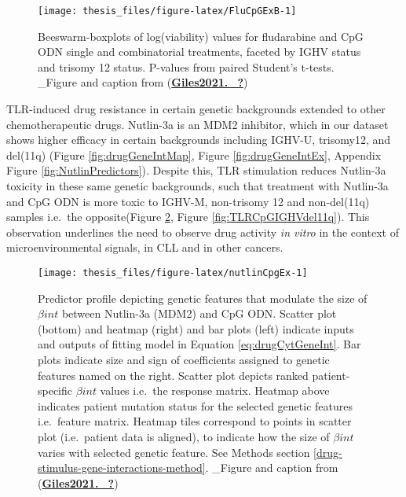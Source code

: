 \documentclass[11pt, a4paper, twosided]{book}
\begin{document}
\begin{figure}

{\centering \texttt{[image: thesis\_files/figure-latex/FluCpGExB-1]} 

}

\caption{Beeswarm-boxplots of log(viability) values for fludarabine and CpG ODN single and combinatorial treatments, faceted by IGHV status and trisomy 12 status. P-values from paired Student's t-tests. \_Figure and caption from (\protect\hyperlink{ref-Giles2021._}{\textbf{Giles2021.\_?}})}\label{fig:FluCpGExB}
\end{figure}
TLR-induced drug resistance in certain genetic backgrounds extended to other chemotherapeutic drugs. Nutlin-3a is an MDM2 inhibitor, which in our dataset shows higher efficacy in certain backgrounds including IGHV-U, trisomy12, and del(11q) (Figure \ref{fig:drugGeneIntMap}, Figure \ref{fig:drugGeneIntEx}, Appendix Figure \ref{fig:NutlinPredictors}). Despite this, TLR stimulation reduces Nutlin-3a toxicity in these same genetic backgrounds, such that treatment with Nutlin-3a and CpG ODN is more toxic to IGHV-M, non-trisomy 12 and non-del(11q) samples i.e.~the opposite(Figure \ref{fig:nutlinCpgEx}, Figure \ref{fig:TLRCpGIGHVdel11q}). This observation underlines the need to observe drug activity \emph{in vitro} in the context of microenvironmental signals, in CLL and in other cancers.


\begin{figure}

{\centering \texttt{[image: thesis\_files/figure-latex/nutlinCpgEx-1]} 

}

\caption{Predictor profile depicting genetic features that modulate the size of \(\beta{int}\) between Nutlin-3a (MDM2) and CpG ODN. Scatter plot (bottom) and heatmap (right) and bar plots (left) indicate inputs and outputs of fitting model in Equation \eqref{eq:drugCytGeneInt}. Bar plots indicate size and sign of coefficients assigned to genetic features named on the right. Scatter plot depicts ranked patient-specific \(\beta{int}\) values i.e.~the response matrix. Heatmap above indicates patient mutation status for the selected genetic features i.e.~feature matrix. Heatmap tiles correspond to points in scatter plot (i.e.~patient data is aligned), to indicate how the size of \(\beta{int}\) varies with selected genetic feature. See Methods section \ref{drug-stimulus-gene-interactions-method}. \_Figure and caption from (\protect\hyperlink{ref-Giles2021._}{\textbf{Giles2021.\_?}})}\label{fig:nutlinCpgEx}
\end{figure}
\end{document}
